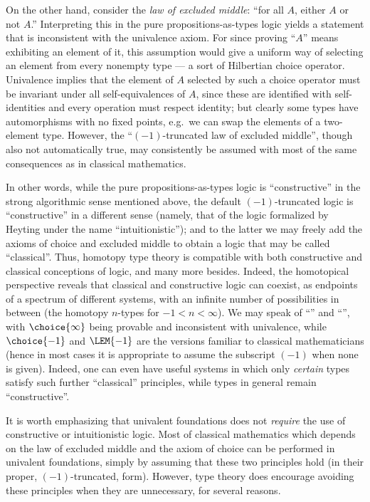 %
%
On the other hand, consider the \emph{law of excluded middle}: ``for all $A$, either $A$ or not $A$.''
Interpreting this in the pure propositions-as-types logic yields a statement that is inconsistent with the univalence axiom.
For since proving ``$A$'' means exhibiting an element of it, this assumption would give a uniform way of selecting an element from every nonempty type --- a sort of Hilbertian choice operator.
Univalence implies that the element of $A$ selected by such a choice operator must be invariant under all self-equivalences of $A$, since these are identified with self-identities and every operation must respect identity; but clearly some types have automorphisms with no fixed points, e.g.\ we can swap the elements of a two-element type.
%
However, the ``$(-1)$-truncated law of excluded middle'', though also not automatically true, may consistently be assumed with most of the same consequences as in classical mathematics.

In other words, while the pure propositions-as-types logic is ``constructive'' in the strong algorithmic sense mentioned above, the default $(-1)$-truncated logic is ``constructive'' in a different sense (namely, that of the logic formalized by Heyting under the name ``intuitionistic''); and to the latter we may freely add the axioms of choice and excluded middle to obtain a logic that may be called ``classical''.
Thus, homotopy type theory is compatible with both constructive and classical conceptions of logic, and many more besides.
%
Indeed, the homotopical perspective reveals that classical and constructive logic can coexist, as endpoints of a spectrum of different systems, with an infinite number of possibilities in between (the homotopy $n$-types for $-1 < n < \infty$).
We may speak of ``'' and ``'', with $\choice{\infty}$ being provable and \LEM{\infty} inconsistent with univalence, while $\choice{-1}$ and $\LEM{-1}$ are the versions familiar to classical mathematicians (hence in most cases it is appropriate to assume the subscript $(-1)$ when none is given).  Indeed, one can even have useful systems in which only \emph{certain} types satisfy such further ``classical'' principles, while types in general remain ``constructive''.%

It is worth emphasizing that univalent foundations does not \emph{require} the use of constructive or intuitionistic logic. %
Most of classical mathematics which depends on the law of excluded middle and the axiom of choice can be performed in univalent foundations, simply by assuming that these two principles hold (in their proper, $(-1)$-truncated, form).
However, type theory does encourage avoiding these principles when they are unnecessary, for several reasons.

